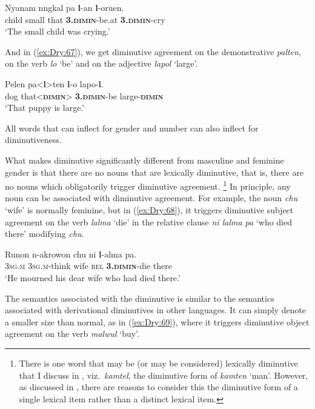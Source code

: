 \documentclass[output=collectionpaper]{langsci/langscibook}
\begin{document}
\ea \label{ex:Dry:66}
\gll Nyanam	nngkal	pa	\textbf{l}-an	\textbf{l}-oruen.\\
child small that \textbf{\textsc{3.dimin}}-be.at \textbf{\textsc{3.dimin}}-cry\\
\glt `The small child was crying.'
\z

And in (\ref{ex:Dry:67}), we get diminutive agreement on the demonstrative \textit{palten}, on the verb \textit{lo} `be' and on the adjective \textit{lapol} `large'.

\ea \label{ex:Dry:67}
\gll Pelen	pa<\textbf{l}>ten	\textbf{l}-o	lapo-\textbf{l}.\\
dog that<\textbf{\textsc{dimin}}> \textbf{\textsc{3.dimin}}-be large-\textbf{\textsc{dimin}}\\
\glt `That puppy is large.'
\z

All words that can inflect for gender and number can also inflect for diminutiveness.

What makes diminutive significantly different from masculine and feminine gender is that there are no nouns that are lexically diminutive, that is, there are no nouns which obligatorily trigger diminutive agreement.%
\footnote{There is one word that may be (or may be considered) lexically diminutive that I discuss in \citet{DryerUnderrevision}, viz.\ \textit{kamtel}, the diminutive form of \textit{kamten} `man'. However, as discussed in \citet{DryerUnderrevision}, there are reasons to consider this the diminutive form of a single lexical item rather than a distinct lexical item.} %
In principle, any noun can be associated with diminutive agreement. For example, the noun \textit{chu} `wife' is normally feminine, but in (\ref{ex:Dry:68}), it triggers diminutive subject agreement on the verb \textit{lalma} `die' in the relative clause \textit{ni lalma pa} `who died there' modifying \textit{chu}.

\ea \label{ex:Dry:68}
\gll Runon	n-akrowon	chu	ni	\textbf{l}-alma	pa.\\
\textsc{3sg.m} \textsc{3sg.m}-think wife \textsc{rel} \textbf{\textsc{3.dimin}}-die there\\
\glt `He mourned his dear wife who had died there.'
\z

The semantics associated with the  diminutive is similar to the semantics associated with derivational diminutives in other languages. It can simply denote a smaller size than normal, as in (\ref{ex:Dry:69}), where it triggers diminutive object agreement on the verb \textit{malwul} `buy'.
\end{document}
